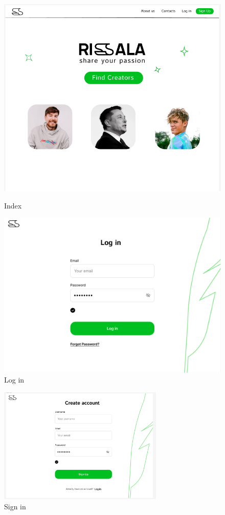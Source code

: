 \clearpage
\begin{figure}[htbp]
    \centering
    \begin{minipage}[b]{0.7\textwidth}
        \centering
        \includegraphics[width=\textwidth]{interfaces/index.png}
        \caption{Index}
        \label{fig:index}
    \end{minipage}
    \hfill
    \begin{minipage}[b]{0.7\textwidth}
        \centering
        \includegraphics[width=\textwidth]{interfaces/log in.png}
        \caption{Log in}
        \label{fig:connexion}
    \end{minipage}
\end{figure}
\begin{figure}
    \centering
    \includegraphics[width=0.7\textwidth,height=1\textheight,keepaspectratio]{interfaces/sign up.png}
    \caption{Sign in}
    \label{fig:diagramme}
\end{figure}